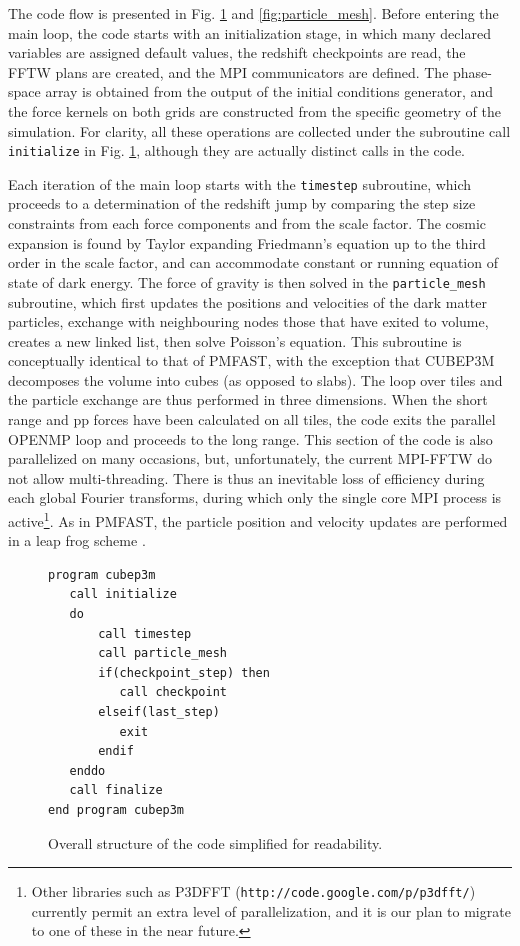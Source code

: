 \documentclass[useAMS,usenatbib]{mn2e}
\begin{document}
The code flow is presented in Fig. \ref{fig:structure} and \ref{fig:particle_mesh}.
Before entering the main loop, the code starts with an initialization stage, 
in which many declared variables are assigned default values,
the redshift checkpoints are read, the {\small FFTW} plans are created, and the {\small MPI} communicators are defined.
The phase-space array  is obtained from the output of the initial conditions generator,
and the force kernels on both grids are constructed from the specific geometry of the simulation.
For clarity, all these operations are collected under the subroutine call {\tt initialize} in Fig. \ref{fig:structure}, 
although they are actually distinct calls in the code.

Each iteration of the main loop starts with the {\tt timestep} subroutine, 
which proceeds to a determination of the redshift jump by comparing the step size constraints from each
force components and from the scale factor.
The cosmic expansion is found by Taylor expanding Friedmann's equation up to the third order in the scale factor,
and can accommodate constant or running equation of state of dark energy.
The force of gravity is then solved  in the {\tt particle\_mesh} subroutine,
which first updates the positions and velocities of the dark matter particles, exchange with neighbouring nodes those that have exited to volume,
creates a new linked list, then solve Poisson's equation.  This subroutine is conceptually identical to that of {\small PMFAST}, 
with the exception  that {\small CUBEP3M} decomposes the volume into cubes (as opposed to slabs). 
The loop over tiles and the particle exchange are thus performed in three dimensions.
When the short range and pp forces have been calculated on all tiles, the code exits the parallel {\small OPENMP} loop
and proceeds to the long range. This section of the code is also parallelized on many occasions, but, unfortunately, the current {\small MPI-FFTW}
do not allow multi-threading. There is thus an inevitable loss of efficiency during each global Fourier transforms, during which
only the single core {\small MPI} process is active\footnote{Other libraries such as {\small P3DFFT} ({\tt http://code.google.com/p/p3dfft/}) currently permit
 an extra level of parallelization, and it is our plan to migrate to one of these in the near future.}.
 As in {\small PMFAST}, the particle position and velocity updates are performed in a leap frog scheme \citep{1981csup.book.....H}.

\begin{figure}
\begin{verbatim}
program cubep3m
   call initialize
   do
       call timestep
       call particle_mesh
       if(checkpoint_step) then
          call checkpoint
       elseif(last_step)
          exit
       endif
   enddo
   call finalize
end program cubep3m
\end{verbatim}
\caption{Overall structure of the code simplified for readability.}
\label{fig:structure}
\end{figure}
\end{document}
